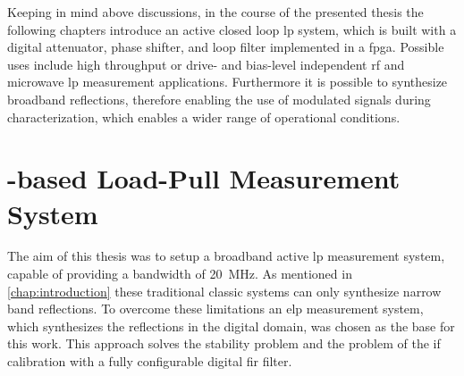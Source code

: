 \documentclass[12pt,a4paper,parskip=full,abstract=true,BCOR=12mm,twoside,open=right]{scrreprt}
\begin{document}
Keeping in mind above discussions, in the course of the presented thesis the following chapters introduce an active closed loop \gls{lp} system, which
is built with a digital attenuator, phase shifter, and loop filter implemented
in a \gls{fpga}. Possible uses include high throughput or drive- and bias-level
independent \gls{rf} and microwave \gls{lp} measurement applications. Furthermore
it is possible to synthesize broadband reflections, therefore enabling the use
of modulated signals during characterization, which enables a wider range of
operational conditions.


\chapter{-based Load-Pull Measurement System}
\label{chap:measurement_system}

The aim of this thesis was to setup a broadband active \gls{lp} measurement system, capable of providing a bandwidth of \SI{20}{\mega\hertz}.
As mentioned in \cref{chap:introduction} these traditional classic systems can only synthesize
narrow band reflections. To overcome these limitations an \gls{elp} measurement system, which
synthesizes the reflections in the digital domain, was chosen as the base for this work. This approach solves the stability problem
and the problem of the \gls{if} calibration with a fully configurable digital \gls{fir} filter.
\end{document}
